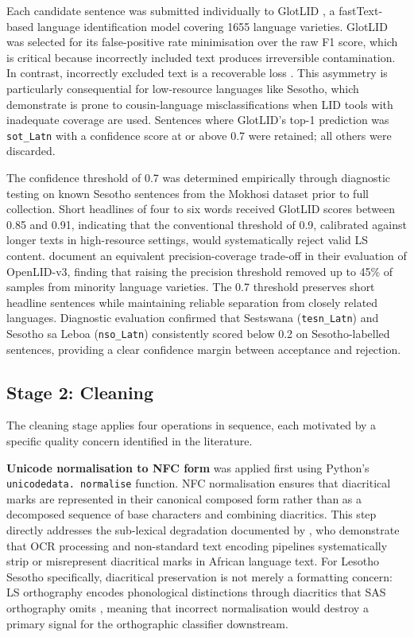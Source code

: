 \documentclass[11pt,a4paper]{article}
\begin{document}
Each candidate sentence was submitted individually to GlotLID \citep{kargaran2024glotcc}, a fastText-based language identification model covering 1655 language varieties. GlotLID was selected for its false-positive rate minimisation over the raw F1 score, which is critical because incorrectly included text produces irreversible contamination. In contrast, incorrectly excluded text is a recoverable loss \citep{kreutzer-etal-2022-quality}. This asymmetry is particularly consequential for low-resource languages like Sesotho, which \citet{kargaran2024glotcc} demonstrate is prone to cousin-language misclassifications when LID tools with inadequate coverage are used. Sentences where GlotLID's top-1 prediction was \texttt{sot\_Latn} with a confidence score at or above 0.7 were retained; all others were discarded.

The confidence threshold of 0.7 was determined empirically through diagnostic testing on known Sesotho sentences from the Mokhosi dataset prior to full collection. Short headlines of four to six words received GlotLID scores between 0.85 and 0.91, indicating that the conventional threshold of 0.9, calibrated against longer texts in high-resource settings, would systematically reject valid LS content. \citet{fedorova2026openlid} document an equivalent precision-coverage trade-off in their evaluation of OpenLID-v3, finding that raising the precision threshold removed up to 45\% of samples from minority language varieties. The 0.7 threshold preserves short headline sentences while maintaining reliable separation from closely related languages. Diagnostic evaluation confirmed that Sestswana (\texttt{tesn\_Latn}) and Sesotho sa Leboa (\texttt{nso\_Latn}) consistently scored below 0.2 on Sesotho-labelled sentences, providing a clear confidence margin between acceptance and rejection.
\subsection{Stage 2: Cleaning}
The cleaning stage applies four operations in sequence, each
motivated by a specific quality concern identified in the literature.

\textbf{Unicode normalisation to NFC form} was applied first using
Python's \texttt{unicodedata. normalise} function. NFC normalisation
ensures that diacritical marks are represented in their canonical
composed form rather than as a decomposed sequence of base characters
and combining diacritics. This step directly addresses the sub-lexical
degradation documented by \citet{de2007automatic}, who
demonstrate that OCR processing and non-standard text encoding
pipelines systematically strip or misrepresent diacritical marks in
African language text. For Lesotho Sesotho specifically, diacritical
preservation is not merely a formatting concern: LS orthography
encodes phonological distinctions through diacritics that SAS
orthography omits \citep{matlosa2017sesotho}, meaning that incorrect
normalisation would destroy a primary signal for the orthographic
classifier downstream.
\end{document}
